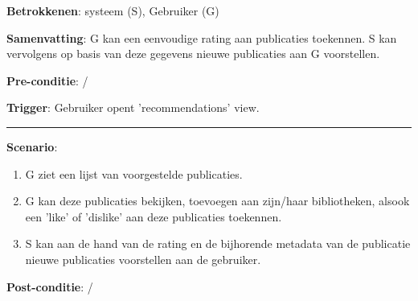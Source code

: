 \noindent \textbf{Betrokkenen}: systeem (S), Gebruiker (G)
\vspace{2 mm}

\noindent \textbf{Samenvatting}: G kan een eenvoudige rating aan publicaties toekennen. S kan vervolgens op basis van deze gegevens nieuwe publicaties aan G voorstellen. 
\vspace{2 mm}

\noindent \textbf{Pre-conditie}: /
\vspace{2 mm}

\noindent \textbf{Trigger}: Gebruiker opent 'recommendations' view.
\vspace{4 mm}

\hrule
\vspace{2 mm}
\noindent \textbf{Scenario}:
\begin{enumerate}
\item G ziet een lijst van voorgestelde publicaties.
\item G kan deze publicaties bekijken, toevoegen aan zijn/haar bibliotheken, alsook een 'like' of 'dislike' aan deze publicaties toekennen. 
\item S kan aan de hand van de rating en de bijhorende metadata van de publicatie nieuwe publicaties voorstellen aan de gebruiker. 
\end{enumerate}
\noindent \textbf{Post-conditie}: / \\









